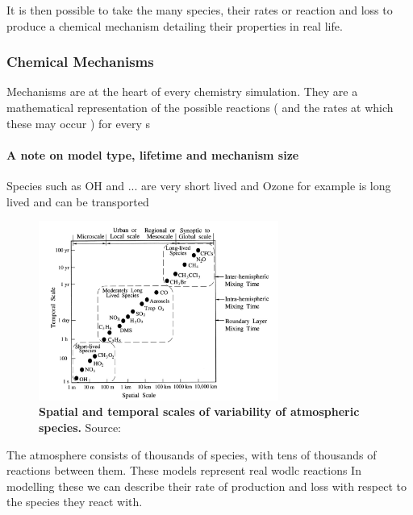 It is then possible to take the many species, their rates or reaction and loss to produce a chemical mechanism detailing their properties in real life.



\subsubsection{Chemical Mechanisms}
Mechanisms are at the heart of every chemistry simulation. They are a mathematical representation of the possible reactions ( and the rates at which these may occur ) for every s
\paragraph{A note on model type, lifetime and mechanism size}
Species such as OH and ... are very short lived and
Ozone for example is long lived and can be transported


\begin{figure}[H]
  \centering
  \includegraphics[width=0.7\textwidth]{timescales.png}
  \caption{\textbf{Spatial and temporal scales of variability of atmospheric species.} Source: \citep{transporttime}}
  \label{fig:timescales}
\end{figure}

The atmosphere consists of thousands of species, with tens of thousands of reactions between them.
These models represent real wodlc reactions
In modelling these we can describe their rate of production and loss with respect to the species they react with.
